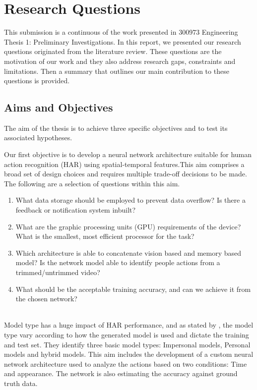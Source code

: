 
\chapter{Research Questions} %

\label{Chapter1} %
This submission is a continuous of the work presented in 300973 Engineering Thesis 1: Preliminary Investigations. In this report, we presented our research questions originated from the literature review. These questions are the motivation of our work and they also address research gaps, constraints and limitations. Then a summary that outlines our main contribution to these questions is provided.

\newcommand{\keyword}[1]{\textbf{#1}}
\newcommand{\tabhead}[1]{\textbf{#1}}
\newcommand{\code}[1]{\texttt{#1}}
\newcommand{\file}[1]{\texttt{\bfseries#1}}
\newcommand{\option}[1]{\texttt{\itshape#1}}

\section{Aims and Objectives}
The aim of the thesis is to achieve three specific objectives and to test its associated hypotheses.


Our first objective is to develop a neural network architecture suitable for human action recognition (HAR) using spatial-temporal features.This aim comprises a broad set of design choices and requires multiple trade-off decisions to be made. The following are a selection of questions within this aim.
\begin{enumerate}
    \item What data storage should be employed to prevent data overflow? Is there a feedback or notification system inbuilt?
    \item What are the graphic processing units (GPU) requirements of the device? What is the smallest, most efficient processor for the task?
    \item Which architecture is able to concatenate vision based and memory based model? Is the network model able to identify people actions from a trimmed/untrimmed video?  
    \item What should be the acceptable training accuracy, and can we achieve it from the chosen network?
\end{enumerate}\\
Model type has a huge impact of HAR performance, and as stated by \cite{lockhart2014limitations}, the model type vary according to how the generated model is used and dictate the training and test set. They identify three basic model types: Impersonal models, Personal models and hybrid models. This aim includes the development of a custom neural network architecture used to analyze the actions based on two conditions: Time and appearance. The network is also estimating the accuracy against ground truth data.\\ 

